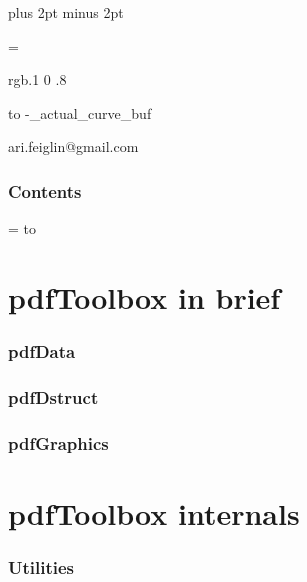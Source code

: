 


\parindent=0pt
\parskip=3pt plus 2pt minus 2pt

\footline={}


\color rgb{.1 0 .8}

\hbox to \dimexpr\hsize-\_actual_curve_buf
\kern-5pt
{\def\boxshadowcolor{rgb{.3 .3 .8}}

    \centerline{\pdftoolbox[35pt]}
    \smallskip
    \centerline{ari.feiglin@gmail.com}

\eppbox

\bigskip


    

\eppbox

    \section*{Contents}
    
    \tableofcontents
\eppbox

}

\color{black}

\newif\ifpageodd
\pageoddtrue
\headline={%
    \hbox to \hsize{\color{black}%
        \ifpageodd\hfil{\it\currsection\quad\bf\folio}\global\pageoddfalse%
        \else{\bf\folio\quad\it\currsection}\hfil\global\pageoddtrue\fi%
    }%
}


\part{pdfToolbox in brief}

\section{pdfData}



\section{pdfDstruct}



\section{pdfGraphics}



\part{pdfToolbox internals}

\section{Utilities}



\bye


